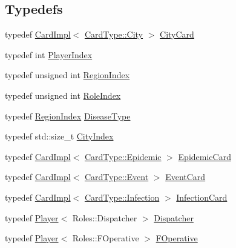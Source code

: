 \subsection*{Typedefs}
\begin{DoxyCompactItemize}
\item 
typedef \hyperlink{classpan_1_1_card_impl}{Card\+Impl}$<$ \hyperlink{namespacepan_a1f7350bfd0421afeabe9fa95c16fa811a57d056ed0984166336b7879c2af3657f}{Card\+Type\+::\+City} $>$ \hyperlink{namespacepan_ae049a214a793815ae007f571e9e96b1c}{City\+Card}
\item 
typedef int \hyperlink{namespacepan_a0cdabf874fbf1bb3a1f0152d108c2909}{Player\+Index}
\item 
typedef unsigned int \hyperlink{namespacepan_a648dcc32a76222a9e4cd4a3e80bda642}{Region\+Index}
\item 
typedef unsigned int \hyperlink{namespacepan_ac258882dced8096a31086622ed4300fa}{Role\+Index}
\item 
typedef \hyperlink{namespacepan_a648dcc32a76222a9e4cd4a3e80bda642}{Region\+Index} \hyperlink{namespacepan_a48851b51b0aef3f0e1be80df5031d9d7}{Disease\+Type}
\item 
typedef std\+::size\+\_\+t \hyperlink{namespacepan_afaed28aa6603153dcc062a028602d697}{City\+Index}
\item 
typedef \hyperlink{classpan_1_1_card_impl}{Card\+Impl}$<$ \hyperlink{namespacepan_a1f7350bfd0421afeabe9fa95c16fa811a62eff626cf0804badc417196cfd09a12}{Card\+Type\+::\+Epidemic} $>$ \hyperlink{namespacepan_aa8e418f131c97133de2a86d1d94a98d3}{Epidemic\+Card}
\item 
typedef \hyperlink{classpan_1_1_card_impl}{Card\+Impl}$<$ \hyperlink{namespacepan_a1f7350bfd0421afeabe9fa95c16fa811aa4ecfc70574394990cf17bd83df499f7}{Card\+Type\+::\+Event} $>$ \hyperlink{namespacepan_ab3f94f87c22e9ba090564fe9bba65b98}{Event\+Card}
\item 
typedef \hyperlink{classpan_1_1_card_impl}{Card\+Impl}$<$ \hyperlink{namespacepan_a1f7350bfd0421afeabe9fa95c16fa811af0ddc0838281faf6d55e2cf840a2a8ef}{Card\+Type\+::\+Infection} $>$ \hyperlink{namespacepan_ad7a96d727f36749dbd39428e2a007de5}{Infection\+Card}
\item 
typedef \hyperlink{classpan_1_1_player}{Player}$<$ Roles\+::\+Dispatcher $>$ \hyperlink{namespacepan_ab83794c5a8984145e9229aa6b173d270}{Dispatcher}
\item 
typedef \hyperlink{classpan_1_1_player}{Player}$<$ Roles\+::\+F\+Operative $>$ \hyperlink{namespacepan_a1d40de3e068a7ad89e8896a584f62f2e}{F\+Operative}

\end{DoxyCompactItemize}
